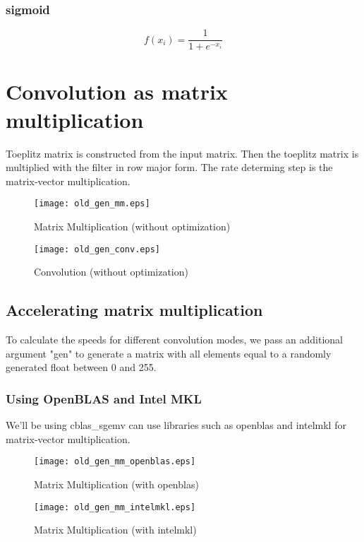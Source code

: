 \documentclass{article}
\begin{document}
            \subsubsection{sigmoid}
                $$ f(x_i) = \frac{\mathrm{1}}{\mathrm{1} + e^{-x_i}} $$

\newpage
    \section{Convolution as matrix multiplication}
        Toeplitz matrix is constructed from the input matrix.
        Then the toeplitz matrix is multiplied with the filter in row major form.
        The rate determing step is the matrix-vector multiplication.

    \begin{figure}[!htb]
    \centering
        \texttt{[image: old\_gen\_mm.eps]}
        \caption{Matrix Multiplication (without optimization)}
    \end{figure}
    \begin{figure}[!htb]
    \centering
        \texttt{[image: old\_gen\_conv.eps]}
        \caption{Convolution (without optimization)}
    \end{figure}

\newpage
    \subsection{Accelerating matrix multiplication}
        To calculate the speeds for different convolution modes,
        we pass an additional argument "gen" to generate a matrix with all elements
        equal to a randomly generated float between 0 and 255. \\
        \subsubsection{Using OpenBLAS\cite{openblas} and Intel MKL\cite{intelmkl}}
            We'll be using cblas\_sgemv can use libraries such as openblas and intelmkl for matrix-vector multiplication.

    \begin{figure}[!htb]
    \centering
        \texttt{[image: old\_gen\_mm\_openblas.eps]}
        \caption{Matrix Multiplication (with openblas)}
    \end{figure}
    \begin{figure}[!htb]
    \centering
        \texttt{[image: old\_gen\_mm\_intelmkl.eps]}
        \caption{Matrix Multiplication (with intelmkl)}
    \end{figure}
\end{document}
